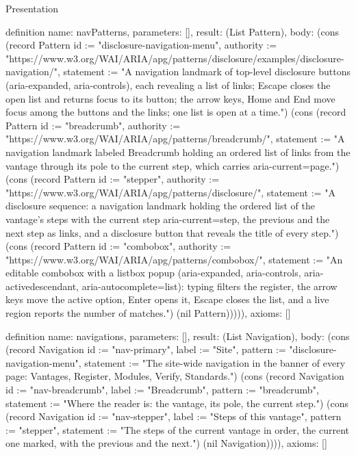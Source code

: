 \begin{lexlean}{Presentation}
\begin{semanticmodule}
definition{
  name: navPatterns,
  parameters: [],
  result: (List Pattern),
  body: (cons (record Pattern {id := "disclosure-navigation-menu", authority := "https://www.w3.org/WAI/ARIA/apg/patterns/disclosure/examples/disclosure-navigation/", statement := "A navigation landmark of top-level disclosure buttons (aria-expanded, aria-controls), each revealing a list of links; Escape closes the open list and returns focus to its button; the arrow keys, Home and End move focus among the buttons and the links; one list is open at a time."}) (cons (record Pattern {id := "breadcrumb", authority := "https://www.w3.org/WAI/ARIA/apg/patterns/breadcrumb/", statement := "A navigation landmark labeled Breadcrumb holding an ordered list of links from the vantage through its pole to the current step, which carries aria-current=page."}) (cons (record Pattern {id := "stepper", authority := "https://www.w3.org/WAI/ARIA/apg/patterns/disclosure/", statement := "A disclosure sequence: a navigation landmark holding the ordered list of the vantage's steps with the current step aria-current=step, the previous and the next step as links, and a disclosure button that reveals the title of every step."}) (cons (record Pattern {id := "combobox", authority := "https://www.w3.org/WAI/ARIA/apg/patterns/combobox/", statement := "An editable combobox with a listbox popup (aria-expanded, aria-controls, aria-activedescendant, aria-autocomplete=list): typing filters the register, the arrow keys move the active option, Enter opens it, Escape closes the list, and a live region reports the number of matches."}) (nil Pattern))))),
  axioms: []
}

definition{
  name: navigations,
  parameters: [],
  result: (List Navigation),
  body: (cons (record Navigation {id := "nav-primary", label := "Site", pattern := "disclosure-navigation-menu", statement := "The site-wide navigation in the banner of every page: Vantages, Register, Modules, Verify, Standards."}) (cons (record Navigation {id := "nav-breadcrumb", label := "Breadcrumb", pattern := "breadcrumb", statement := "Where the reader is: the vantage, its pole, the current step."}) (cons (record Navigation {id := "nav-stepper", label := "Steps of this vantage", pattern := "stepper", statement := "The steps of the current vantage in order, the current one marked, with the previous and the next."}) (nil Navigation)))),
  axioms: []
}


\end{semanticmodule}
\end{lexlean}
